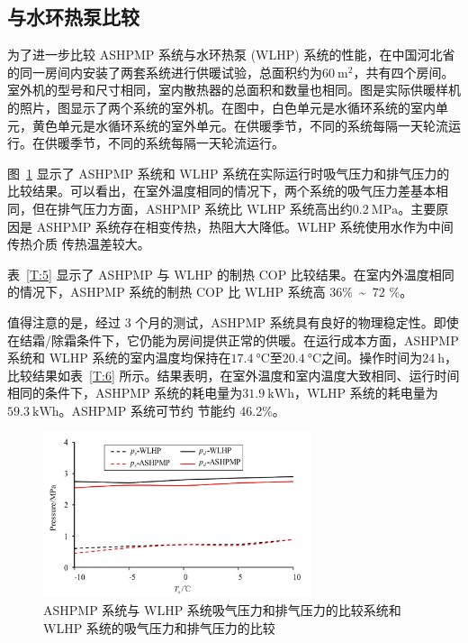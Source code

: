 \subsection{与水环热泵比较}

为了进一步比较 ASHPMP 系统与水环热泵 (WLHP) 系统的性能，在中国河北省的同一房间内安装了两套系统进行供暖试验，总面积约为$\qty{60}{\m^2}$，共有四个房间。室外机的型号和尺寸相同，室内散热器的总面积和数量也相同。图是实际供暖样机的照片，图显示了两个系统的室外机。在图中，白色单元是水循环系统的室内单元，黄色单元是水循环系统的室外单元。在供暖季节，不同的系统每隔一天轮流运行。在供暖季节，不同的系统每隔一天轮流运行。

图~\ref{F:16} 显示了 ASHPMP 系统和 WLHP 系统在实际运行时吸气压力和排气压力的比较结果。可以看出，在室外温度相同的情况下，两个系统的吸气压力差基本相同，但在排气压力方面，ASHPMP 系统比 WLHP 系统高出约$\qty{0.2}{\MPa} $。主要原因是 ASHPMP 系统存在相变传热，热阻大大降低。WLHP 系统使用水作为中间传热介质 传热温差较大。

表~\ref{T:5} 显示了 ASHPMP 与 WLHP 的制热 COP 比较结果。在室内外温度相同的情况下，ASHPMP 系统的制热 COP 比 WLHP 系统高 36\%~\textasciitilde~72 \%。

值得注意的是，经过 3 个月的测试，ASHPMP 系统具有良好的物理稳定性。即使在结霜/除霜条件下，它仍能为房间提供正常的供暖。在运行成本方面，ASHPMP 系统和 WLHP 系统的室内温度均保持在$\qty{17.4}{\degreeCelsius} $至$\qty{20.4}{\degreeCelsius} $之间。操作时间为$\qty{24}{\hour} $，比较结果如表~\ref{T:6} 所示。结果表明，在室外温度和室内温度大致相同、运行时间相同的条件下，ASHPMP 系统的耗电量为$\qty{31.9}{\kWh} $，WLHP 系统的耗电量为$\qty{59.3}{\kWh} $。ASHPMP 系统可节约 节能约 46.2\%。

\begin{figure}[htbp]
	\centering
	\includegraphics[width=0.7\textwidth]{picture/picture_16}
	\caption{ASHPMP 系统与 WLHP 系统吸气压力和排气压力的比较系统和 WLHP 系统的吸气压力和排气压力的比较}
	\label{F:16}
\end{figure}

